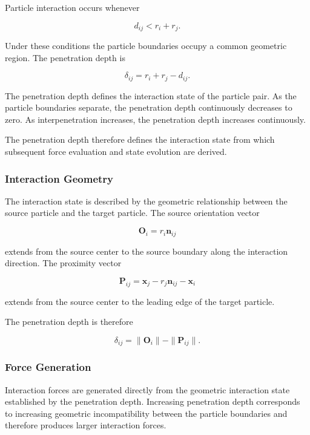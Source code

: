 Particle interaction occurs whenever

\begin{equation}
d_{ij}<r_i+r_j.
\end{equation}

Under these conditions the particle boundaries
occupy a common geometric region. The penetration
depth is

\begin{equation}
\delta_{ij}
=
r_i+r_j-d_{ij}.
\end{equation}

The penetration depth defines the interaction state
of the particle pair. As the particle boundaries
separate, the penetration depth continuously
decreases to zero. As interpenetration increases,
the penetration depth increases continuously.

The penetration depth therefore defines the
interaction state from which subsequent force
evaluation and state evolution are derived.


\subsubsection{Interaction Geometry}
The interaction state is described by the geometric
relationship between the source particle and the
target particle. The source orientation vector

\begin{equation}
\mathbf O_i
=
r_i\mathbf n_{ij}
\end{equation}

extends from the source center to the source
boundary along the interaction direction. The
proximity vector

\begin{equation}
\mathbf P_{ij}
=
\mathbf x_j-r_j\mathbf n_{ij}-\mathbf x_i
\end{equation}

extends from the source center to the leading edge
of the target particle.

The penetration depth is therefore

\begin{equation}
\delta_{ij}
=
\|\mathbf O_i\|
-
\|\mathbf P_{ij}\|.
\end{equation}

\subsubsection{Force Generation}

Interaction forces are generated directly from the
geometric interaction state established by the
penetration depth. Increasing penetration depth
corresponds to increasing geometric incompatibility
between the particle boundaries and therefore
produces larger interaction forces.

